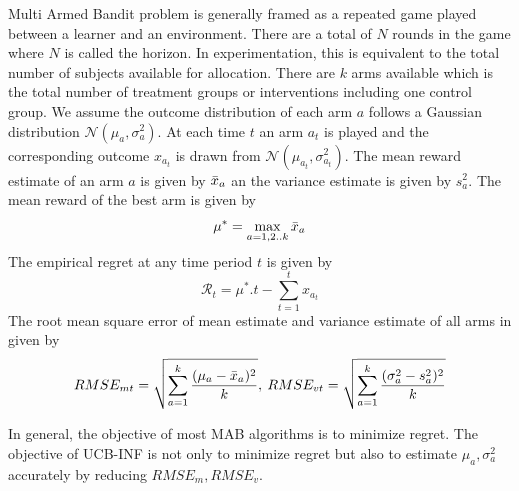 \documentclass[12pt, letterpaper]{article}
\begin{document}
Multi Armed Bandit problem is generally framed as a repeated game played between a learner and an environment. There are a total of $N$ rounds in the game where $N$ is called the horizon. In experimentation, this is equivalent to the total number of subjects available for allocation. There are $k$ arms available which is the total number of treatment groups or interventions including one control group. We assume the outcome distribution of each arm $a$ follows a Gaussian distribution $\mathcal{N}(\mu_a, \sigma_a^2)$. At each time $t$ an arm $a_t$ is played and the corresponding outcome $x_{a_t}$ is drawn from $\mathcal{N}(\mu_{a_t}, \sigma_{a_t}^2)$. The mean reward estimate of an arm $a$ is given by $\Bar{x}_a$ an the variance estimate is given by $s_a^2$. The mean reward of the best arm is given by 
$$\mu^* = \max_{a=1,2..k}\Bar{x}_a$$ 
The empirical regret at any time period $t$ is given by
$$\mathcal{R}_t = \mu^* . t - \sum_{t=1}^{t} x_{a_t}$$
The root mean square error of mean estimate and variance estimate of all arms in given by 
$$RMSE_{mt} = \sqrt{\sum_{a=1}^{k} \frac{(\mu_a -\Bar{x}_a)^2}{k}}, \: RMSE_{vt} = \sqrt{\sum_{a=1}^{k} \frac{(\sigma_a^2 - s_a^2)^2}{k}}$$


In general, the objective of most MAB algorithms is to minimize regret. The objective of UCB-INF is not only to minimize regret but also to estimate $\mu_{a}, \sigma_{a}^2$ accurately by reducing $RMSE_m, RMSE_v$.
\end{document}
